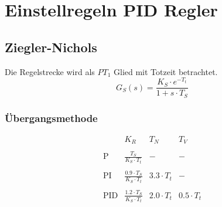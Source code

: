 



\section{Einstellregeln PID Regler}

\subsection{Ziegler-Nichols}
Die Regelstrecke wird als $PT_1$ Glied mit Totzeit betrachtet. 
\[ G_S(s) = \frac{K_S \cdot e^{-T_t}}{1 + s \cdot T_S} \]

\subsubsection{Übergangsmethode}
\[
    \begin{array}{lccc}
        &
            K_R &
            T_N &
            T_V \\\\
        \text{P} &
            \frac{T_S}{K_S \cdot T_t} &
            - &
            - \\\\
        \text{PI} &
            \frac{0.9 \cdot T_S}{K_S \cdot T_t} &
            3.3 \cdot T_t &
            - \\\\
        \text{PID} &
            \frac{1.2 \cdot T_S}{K_S \cdot T_t} &
            2.0 \cdot T_t &
            0.5 \cdot T_t \\\\
    \end{array}
\]

